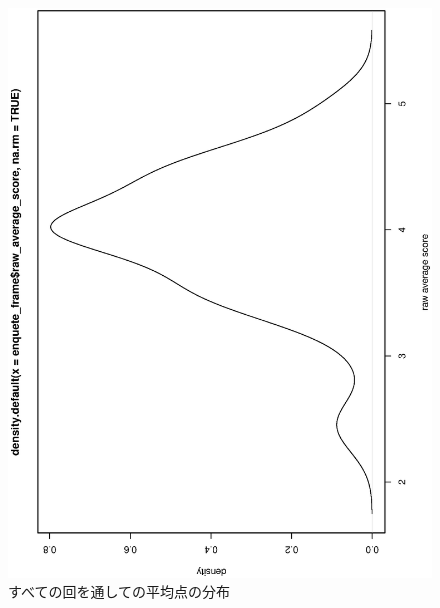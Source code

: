 \begin{frame}
 
\begin{figure}[h]
\begin{center}
 \includegraphics[angle=270,width=0.8\hsize]{image201301/raw_average_score_density.eps}

 \caption{すべての回を通しての平均点の分布}
 \label{fig:all-enquete-score-distribution}
\end{center}
\end{figure}

\end{frame}


